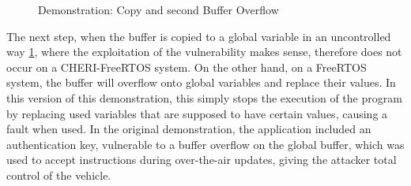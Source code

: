 \documentclass[a4paper, 11pt]{article}
\begin{document}
\begin{figure}
        \begin{center}
        \end{center}
        \caption{Demonstration: Copy and second Buffer Overflow} 
		\label{fig:demo_copy}

\end{figure}
The next step, when the buffer is copied to a global variable in an uncontrolled way \ref{fig:demo_copy}, where the exploitation of the vulnerability makes sense, therefore does not occur on a CHERI-FreeRTOS system. On the other hand, on a FreeRTOS system, the buffer will overflow onto global variables and replace their values. In this version of this demonstration, this simply stops the execution of the program by replacing used variables that are supposed to have certain values, causing a fault when used. In the original demonstration, the application included an authentication key, vulnerable to a buffer overflow on the global buffer, which was used to accept instructions during over-the-air updates, giving the attacker total control of the vehicle. 
\newcommand{\threeRect}[5]{
        \draw (#1,#2) rectangle (#1+5,#2+1);
        \draw (#1,#2+1) rectangle (#1+5,#2+2);
        \draw (#1,#2+2) rectangle (#1+5,#2+3);
        \node at (#1+2.5,0.5) {#3};
        \node at (#1+2.5,1.5) {#4};
        \node at (#1+2.5,2.5) {#5};

}
\end{document}
